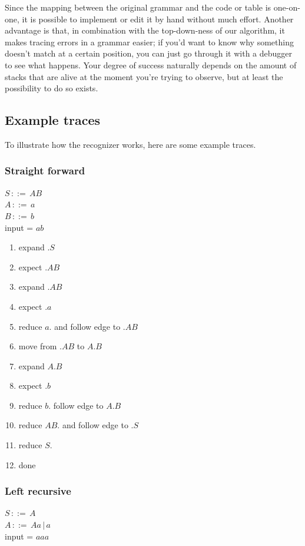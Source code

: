 \documentclass[a4paper,10pt]{article}
\begin{document}
Since the mapping between the original grammar and the code or table is one-on-one, it is possible to implement or edit it by hand without much effort. Another advantage is that, in combination with the top-down-ness of our algorithm, it makes tracing errors in a grammar easier; if you'd want to know why something doesn't match at a certain position, you can just go through it with a debugger to see what happens. Your degree of success naturally depends on the amount of stacks that are alive at the moment you're trying to observe, but at least the possibility to do so exists.

\subsection{Example traces}

To illustrate how the recognizer works, here are some example traces.

\subsubsection{Straight forward}
$S\,::=\,AB$\\
$A\,::=\,a$\\
$B\,::=\,b$\\
input = $ab$

\begin{enumerate}
 \setlength{\itemsep}{0pt}
 \setlength{\parskip}{0pt}
 \setlength{\parsep}{0pt}
 
 \item expand $.S$
 \item expect $.AB$
 \item expand $.AB$
 \item expect $.a$
 \item reduce $a.$ and follow edge to $.AB$
 \item move from $.AB$ to $A.B$
 \item expand $A.B$
 \item expect $.b$
 \item reduce $b.$ follow edge to $A.B$
 \item reduce $AB.$ and follow edge to $.S$
 \item reduce $S.$
 \item done
\end{enumerate}

\subsubsection{Left recursive}
$S\,::=\,A$\\
$A\,::=\,Aa\,|\,a$\\
input = $aaa$
\end{document}
